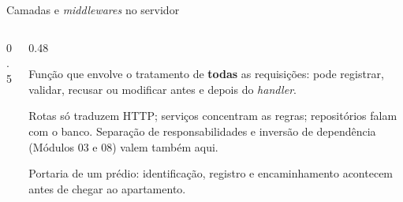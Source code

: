 \documentclass[aspectratio=169,10pt]{beamer}
\begin{document}
\begin{frame}{Camadas e \emph{middlewares} no servidor}
  \begin{columns}[c]
    \begin{column}{0.5\textwidth}
      \centering
    \end{column}
    \begin{column}{0.48\textwidth}
      \begin{definicao}
        Função que envolve o tratamento de \textbf{todas} as requisições: pode registrar, validar, recusar ou modificar antes e depois do \emph{handler}.
      \end{definicao}
      \begin{conceito}
        Rotas só traduzem HTTP; serviços concentram as regras; repositórios falam com o banco. Separação de responsabilidades e inversão de dependência (Módulos 03 e 08) valem também aqui.
      \end{conceito}
      \begin{analogia}
        Portaria de um prédio: identificação, registro e encaminhamento acontecem antes de chegar ao apartamento.
      \end{analogia}
    \end{column}
  \end{columns}
\end{frame}
\end{document}
